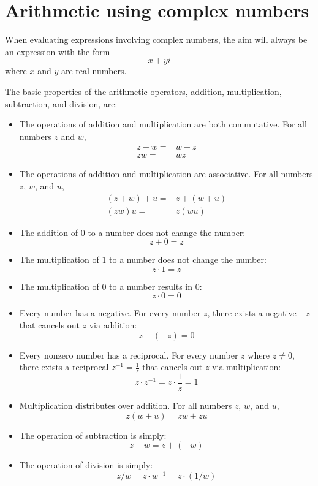 \documentclass{article}
\begin{document}
\section*{Arithmetic using complex numbers}

When evaluating expressions involving complex numbers, the aim will always be an expression with the form 
\[x + yi\]
where \(x\) and \(y\) are real numbers. 

The basic properties of the arithmetic operators, addition, multiplication, subtraction, and division, are:    
\begin{itemize}
\item The operations of addition and multiplication are both commutative. For all numbers \(z\) and \(w\),
\begin{align*}
z + w = & w + z \\
zw = & wz
\end{align*} 
\item The operations of addition and multiplication are associative. For all numbers \(z\), \(w\), and \(u\),
\begin{align*}
(z + w) + u = & z + (w + u) \\
(zw)u = & z(wu)
\end{align*}
\item The addition of \(0\) to a number does not change the number:
\[z + 0 = z\]
\item The multiplication of \(1\) to a number does not change the number:
\[z \cdot 1 = z\]
\item The multiplication of \(0\) to a number results in \(0\):
\[z \cdot 0 = 0\]
\item Every number has a negative. For every number \(z\), there exists a negative \(-z\) that cancels out \(z\) via addition:
\[z + (-z) = 0\]
\item Every nonzero number has a reciprocal. For every number \(z\) where \(z \neq 0\), there exists a reciprocal \(z^{-1} = \frac{1}{z}\) that cancels out \(z\) via multiplication:
\[z \cdot z^{-1} = z \cdot \frac{1}{z} = 1\]
\item Multiplication distributes over addition. For all numbers \(z\), \(w\), and \(u\), 
\[z(w + u) = zw + zu\]
\item The operation of subtraction is simply:
\[z - w = z + (-w)\]
\item The operation of division is simply:
\[z/w = z \cdot w^{-1} = z \cdot (1/w)\]
\end{itemize}
\end{document}

